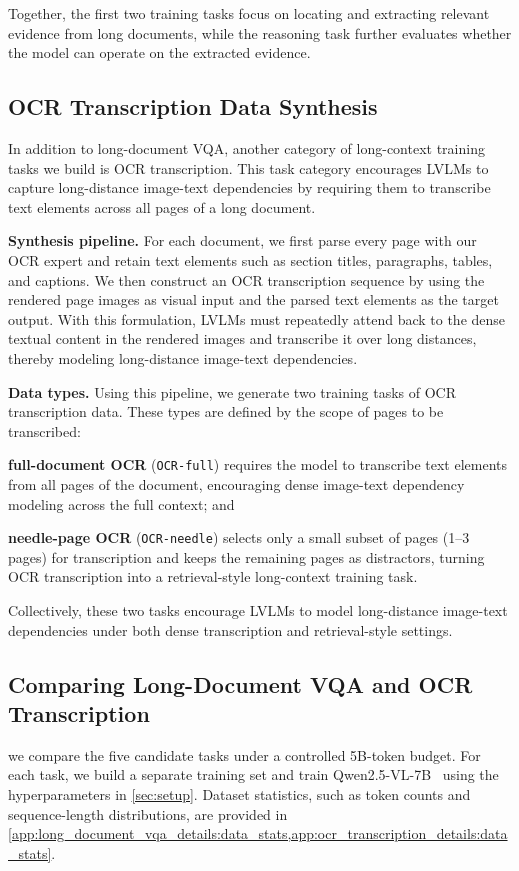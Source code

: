 \documentclass{llmxive}
\providecommand{\ocrfull}{\texttt{OCR-full}\xspace}
\providecommand{\ocrneedle}{\texttt{OCR-needle}\xspace}
\begin{document}
{Together, the first two training tasks focus on locating and extracting relevant evidence from long documents, while the reasoning task further evaluates whether the model can operate on the extracted evidence.

\subsection{OCR Transcription Data Synthesis}
\label{sec:curation:ocr_transcription_method}
In addition to long-document VQA, another category of long-context training tasks we build is OCR transcription.
This task category encourages LVLMs to capture long-distance image-text dependencies by requiring them to transcribe text elements across all pages of a long document.

\noindent\textbf{Synthesis pipeline.}
For each document, we first parse every page with our OCR expert and retain text elements such as section titles, paragraphs, tables, and captions.
We then construct an OCR transcription sequence by using the rendered page images as visual input and the parsed text elements as the target output.
With this formulation, LVLMs must repeatedly attend back to the dense textual content in the rendered images and transcribe it over long distances, thereby modeling long-distance image-text dependencies.

\noindent\textbf{Data types.}
Using this pipeline, we generate two training tasks of OCR transcription data.
These types are defined by the scope of pages to be transcribed: \begin{inparaenum}[(i)]
\item \textbf{full-document OCR} (\ocrfull) requires the model to transcribe text elements from all pages of the document, encouraging dense image-text dependency modeling across the full context; and
\item \textbf{needle-page OCR} (\ocrneedle) selects only a small subset of pages (1--3 pages) for transcription and keeps the remaining pages as distractors, turning OCR transcription into a retrieval-style long-context training task.
\end{inparaenum}
Collectively, these two tasks encourage LVLMs to model long-distance image-text dependencies under both dense transcription and retrieval-style settings.

\subsection{Comparing Long-Document VQA and OCR Transcription}
\label{sec:curation:data_method_compare}
we compare the five candidate tasks under a controlled 5B-token budget. For each task, we build a separate training set and train Qwen2.5-VL-7B~\cite{bai2025qwen2} using the hyperparameters in \cref{sec:setup}. Dataset statistics, such as token counts and sequence-length distributions, are provided in \cref{app:long_document_vqa_details:data_stats,app:ocr_transcription_details:data_stats}.

}
\end{document}
